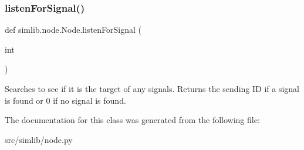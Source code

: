 \subsubsection{\texorpdfstring{listen\+For\+Signal()}{listenForSignal()}}
{\footnotesize\ttfamily def simlib.\+node.\+Node.\+listen\+For\+Signal (\begin{DoxyParamCaption}\item[{}]{int }\end{DoxyParamCaption})}

\begin{DoxyVerb}Searches to see if it is the target of any signals. Returns the sending ID
if a signal is found or 0 if no signal is found.
\end{DoxyVerb}
 

The documentation for this class was generated from the following file\+:\begin{DoxyCompactItemize}
\item 
src/simlib/node.\+py\end{DoxyCompactItemize}
